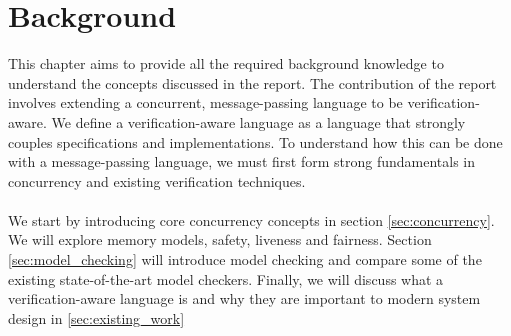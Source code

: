 \chapter{Background}
This chapter aims to provide all the required background knowledge to understand the concepts discussed in the report. The contribution of the report involves extending a concurrent, message-passing language to be verification-aware. We define a verification-aware language as a language that strongly couples specifications and implementations. To understand how this can be done with a message-passing language, we must first form strong fundamentals in concurrency and existing verification techniques.
\\ \\
We start by introducing core concurrency concepts in section \ref{sec:concurrency}. We will explore memory models, safety, liveness and fairness. Section \ref{sec:model_checking} will introduce model checking and compare some of the existing state-of-the-art model checkers. Finally, we will discuss what a verification-aware language is and why they are important to modern system design in \ref{sec:existing_work}
